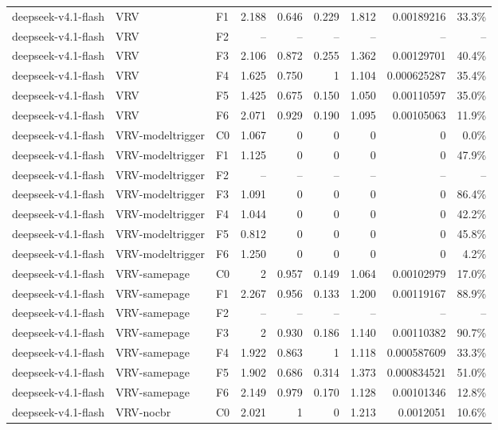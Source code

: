 \begin{tabular}{lllrrrrrr}
deepseek-v4.1-flash & VRV & F1 & 2.188 & 0.646 & 0.229 & 1.812 & 0.00189216 & 33.3\% \\
deepseek-v4.1-flash & VRV & F2 & -- & -- & -- & -- & -- & -- \\
deepseek-v4.1-flash & VRV & F3 & 2.106 & 0.872 & 0.255 & 1.362 & 0.00129701 & 40.4\% \\
deepseek-v4.1-flash & VRV & F4 & 1.625 & 0.750 & 1 & 1.104 & 0.000625287 & 35.4\% \\
deepseek-v4.1-flash & VRV & F5 & 1.425 & 0.675 & 0.150 & 1.050 & 0.00110597 & 35.0\% \\
deepseek-v4.1-flash & VRV & F6 & 2.071 & 0.929 & 0.190 & 1.095 & 0.00105063 & 11.9\% \\
deepseek-v4.1-flash & VRV-modeltrigger & C0 & 1.067 & 0 & 0 & 0 & 0 & 0.0\% \\
deepseek-v4.1-flash & VRV-modeltrigger & F1 & 1.125 & 0 & 0 & 0 & 0 & 47.9\% \\
deepseek-v4.1-flash & VRV-modeltrigger & F2 & -- & -- & -- & -- & -- & -- \\
deepseek-v4.1-flash & VRV-modeltrigger & F3 & 1.091 & 0 & 0 & 0 & 0 & 86.4\% \\
deepseek-v4.1-flash & VRV-modeltrigger & F4 & 1.044 & 0 & 0 & 0 & 0 & 42.2\% \\
deepseek-v4.1-flash & VRV-modeltrigger & F5 & 0.812 & 0 & 0 & 0 & 0 & 45.8\% \\
deepseek-v4.1-flash & VRV-modeltrigger & F6 & 1.250 & 0 & 0 & 0 & 0 & 4.2\% \\
deepseek-v4.1-flash & VRV-samepage & C0 & 2 & 0.957 & 0.149 & 1.064 & 0.00102979 & 17.0\% \\
deepseek-v4.1-flash & VRV-samepage & F1 & 2.267 & 0.956 & 0.133 & 1.200 & 0.00119167 & 88.9\% \\
deepseek-v4.1-flash & VRV-samepage & F2 & -- & -- & -- & -- & -- & -- \\
deepseek-v4.1-flash & VRV-samepage & F3 & 2 & 0.930 & 0.186 & 1.140 & 0.00110382 & 90.7\% \\
deepseek-v4.1-flash & VRV-samepage & F4 & 1.922 & 0.863 & 1 & 1.118 & 0.000587609 & 33.3\% \\
deepseek-v4.1-flash & VRV-samepage & F5 & 1.902 & 0.686 & 0.314 & 1.373 & 0.000834521 & 51.0\% \\
deepseek-v4.1-flash & VRV-samepage & F6 & 2.149 & 0.979 & 0.170 & 1.128 & 0.00101346 & 12.8\% \\
deepseek-v4.1-flash & VRV-nocbr & C0 & 2.021 & 1 & 0 & 1.213 & 0.0012051 & 10.6\% \\

\end{tabular}

